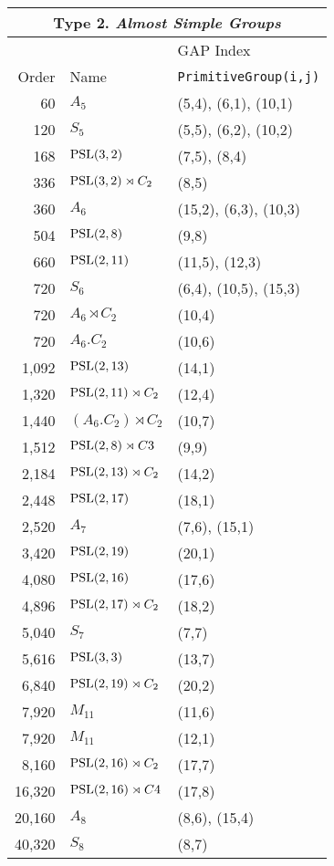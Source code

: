 \begin{center}
{\small
  \begin{tabular}{r|l|l}
  \multicolumn{3}{c}{Type 2. \emph{Almost Simple Groups}}\\\toprule
  & & GAP Index \\
    Order & Name & {\tt PrimitiveGroup(i,j)} \\
\midrule
 60 & $A_5$ & (5,4), (6,1), (10,1) \\
 120 & $S_5$ & (5,5), (6,2), (10,2) \\
 168 & $\operatorname{PSL}(3,2)$ & (7,5), (8,4) \\
 336 & $\operatorname{PSL}(3,2) \rtimes C_2$ & (8,5) \\
 360 & $A_6$ & (15,2), (6,3), (10,3) \\
 504 & $\operatorname{PSL}(2,8)$ & (9,8) \\
 660 & $\operatorname{PSL}(2,11)$ & (11,5), (12,3) \\
 720 & $S_6$ & (6,4), (10,5), (15,3) \\
 720 & $A_6 \rtimes C_2$ & (10,4) \\
 720 & $A_6 . C_2$ & (10,6) \\
 1,092 & $\operatorname{PSL}(2,13)$ & (14,1) \\
 1,320 & $\operatorname{PSL}(2,11) \rtimes C_2$ & (12,4) \\
 1,440 & $(A_6 . C_2) \rtimes C_2$ & (10,7) \\
 1,512 & $\operatorname{PSL}(2,8) \rtimes C3$ & (9,9) \\
 2,184 & $\operatorname{PSL}(2,13) \rtimes C_2$ & (14,2) \\
 2,448 & $\operatorname{PSL}(2,17)$ & (18,1) \\
 2,520 & $A_7$ & (7,6), (15,1) \\
 3,420 & $\operatorname{PSL}(2,19)$ & (20,1) \\
 4,080 & $\operatorname{PSL}(2,16)$ & (17,6) \\
 4,896 & $\operatorname{PSL}(2,17) \rtimes C_2$ & (18,2) \\
 5,040 & $S_7$ & (7,7) \\
 5,616 & $\operatorname{PSL}(3,3)$ & (13,7) \\
 6,840 & $\operatorname{PSL}(2,19) \rtimes C_2$ & (20,2) \\
 7,920 & $M_{11}$ & (11,6) \\
 7,920 & $M_{11}$ & (12,1) \\
 8,160 & $\operatorname{PSL}(2,16) \rtimes C_2$ & (17,7) \\
 16,320 & $\operatorname{PSL}(2,16) \rtimes C4$ & (17,8)\\
 20,160 & $A_8$ & (8,6), (15,4)  \\
 40,320 & $S_8$ & (8,7) \\

\end{tabular}}
\end{center}
